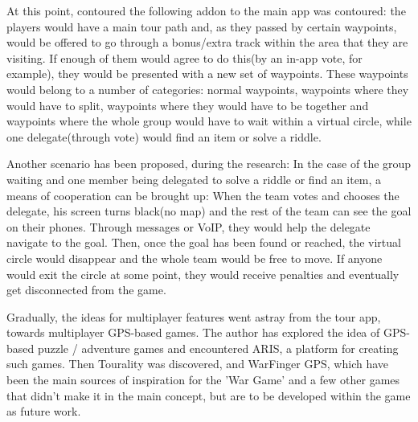 At this point, contoured the following addon to the main app was contoured: the
players would have a main tour path and, as they passed by certain waypoints,
would be offered to go through a bonus/extra track within the area that they are
visiting. If enough of them would agree to do this(by an in-app vote, for
example), they would be presented with a new set of waypoints. These waypoints
would belong to a number of categories: normal waypoints, waypoints where they
would have to split, waypoints where they would have to be together and
waypoints where the whole group would have to wait within a virtual circle,
while one delegate(through vote) would find an item or solve a riddle.\newline

Another scenario has been proposed, during the research: In the case of the
group waiting and one member being delegated to solve a riddle or find an item,
a means of cooperation can be brought up: When the team votes and chooses the
delegate, his screen turns black(no map) and the rest of the team can see
the goal on their phones. Through messages or VoIP, they would help the delegate
navigate to the goal. Then, once the goal has been found or reached, the virtual
circle would disappear and the whole team would be free to move. If anyone would
exit the circle at some point, they would receive penalties and eventually get
disconnected from the game.\newline

Gradually, the ideas for multiplayer features went astray from the tour app,
towards multiplayer GPS-based games. The author has explored the idea of
GPS-based puzzle / adventure games and encountered ARIS, a platform for creating
such games. Then Tourality was discovered, and WarFinger GPS, which have been
the main sources of inspiration for the 'War Game' and a few other games that
didn't make it in the main concept, but are to be developed within the game as
future work.\newline


